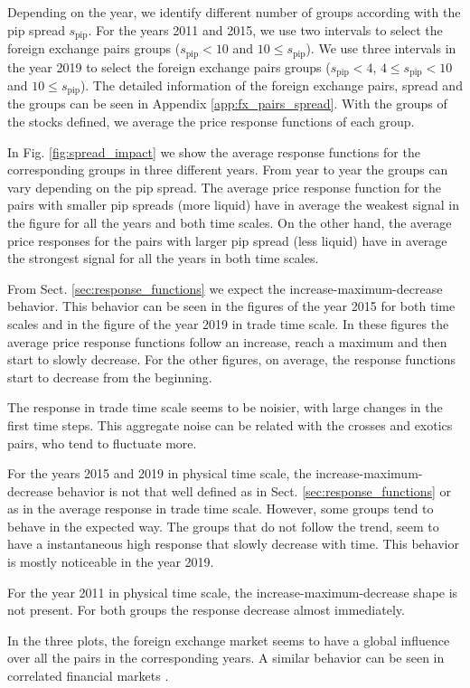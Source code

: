 Depending on the year, we identify different number of groups according with
the pip spread $s_{\textrm{pip}}$. For the years 2011 and 2015, we use two
intervals to select the foreign exchange pairs groups ($s_{\textrm{pip}}<10$
and $10 \le s_{\textrm{pip}}$). We use three intervals in the year 2019 to
select the foreign exchange pairs groups ($s_{\textrm{pip}}<4$,
$4 \le s_{\textrm{pip}} < 10$ and $10 \le s_{\textrm{pip}}$). The detailed
information of the foreign exchange pairs, spread and the groups can be seen in
Appendix \ref{app:fx_pairs_spread}. With the groups of the stocks defined, we
average the price response functions of each group.

In Fig. \ref{fig:spread_impact} we show the average response functions for
the corresponding groups in three different years. From year to year the groups
can vary depending on the pip spread. The average price response function for
the pairs with smaller pip spreads (more liquid) have in average the weakest
signal in the figure for all the years and both time scales. On the other hand,
the average price responses for the pairs with larger pip spread (less liquid)
have in average the strongest signal for all the years in both time scales.

From Sect. \ref{sec:response_functions} we expect the increase-maximum-decrease
behavior. This behavior can be seen in the figures of the year 2015 for both
time scales and in the figure of the year 2019 in trade time scale. In these
figures the average price response functions follow an increase, reach a
maximum and then start to slowly decrease. For the other figures, on average,
the response functions start to decrease from the beginning.

The response in trade time scale seems to be noisier, with large changes in the
first time steps. This aggregate noise can be related with the crosses and
exotics pairs, who tend to fluctuate more.

For the years 2015 and 2019 in physical time scale, the
increase-maximum-decrease behavior is not that well defined as in Sect.
\ref{sec:response_functions} or as in the average response in trade time scale.
However, some groups tend to behave in the expected way. The groups that do not
follow the trend, seem to have a instantaneous high response that slowly
decrease with time. This behavior is mostly noticeable in the year 2019.

For the year 2011 in physical time scale, the increase-maximum-decrease shape
is not present. For both groups the response decrease almost immediately.

In the three plots, the foreign exchange market seems to have a global
influence over all the pairs in the corresponding years. A similar behavior
can be seen in correlated financial markets
\cite{my_paper_response_financial_arxiv}.